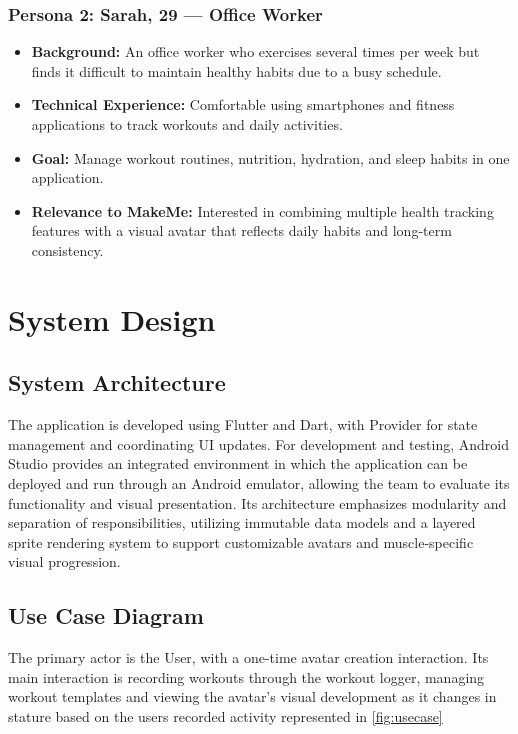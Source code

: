 \documentclass[11pt]{article}
\begin{document}
\subsubsection*{Persona 2: Sarah, 29 --- Office Worker}

\begin{itemize}
    \item \textbf{Background:}
    An office worker who exercises several times per week but finds it difficult to maintain healthy habits due to a busy schedule.
    \item \textbf{Technical Experience:}
    Comfortable using smartphones and fitness applications to track workouts and daily activities.
    \item \textbf{Goal:}
    Manage workout routines, nutrition, hydration, and sleep habits in one application.
    \item \textbf{Relevance to MakeMe:}
    Interested in combining multiple health tracking features with a visual avatar that reflects daily habits and long-term consistency.
\end{itemize}


\section{System Design}
\subsection{System Architecture}
The application is developed using Flutter and Dart, with Provider for state management
and coordinating UI updates. For development and testing, Android Studio provides an integrated
environment in which the application can be deployed and run through an Android emulator,
allowing the team to evaluate its functionality and visual presentation. Its architecture
emphasizes modularity and separation of responsibilities, utilizing immutable data models
and a layered sprite rendering system to support customizable avatars and muscle-specific
visual progression.

\subsection{Use Case Diagram}
The primary actor is the User, with a one-time avatar creation interaction. Its main interaction is recording workouts through the
workout logger, managing workout templates and viewing the avatar’s visual development as it
changes in stature based on the users recorded activity represented in \cref{fig:usecase}
\end{document}
